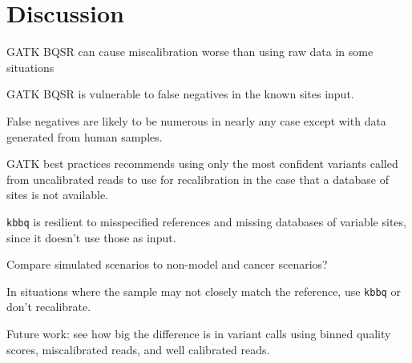 \documentclass{article}
\begin{document}
\section{Discussion}
\begin{outline}
	\item GATK BQSR can cause miscalibration worse than using raw data in some situations
	\item GATK BQSR is vulnerable to false negatives in the known sites input.
	\begin{outline}
		\item False negatives are likely to be numerous \parencite{bobo_false_2016} in nearly any case except with data generated from human samples.
		\item GATK best practices recommends using only the most confident variants called from uncalibrated reads to use for recalibration in the case that a database of sites is not available.
	\end{outline}
	\item \texttt{kbbq} is resilient to misspecified references and missing databases of variable sites, since it doesn't use those as input.
	\item Compare simulated scenarios to non-model and cancer scenarios?
	\begin{outline}
		\item In situations where the sample may not closely match the reference, use \texttt{kbbq} or don't recalibrate.
	\end{outline}
	\item Future work: see how big the difference is in variant calls using binned quality scores, miscalibrated reads, and well calibrated reads.
\end{outline}

\printbibliography
\end{document}

